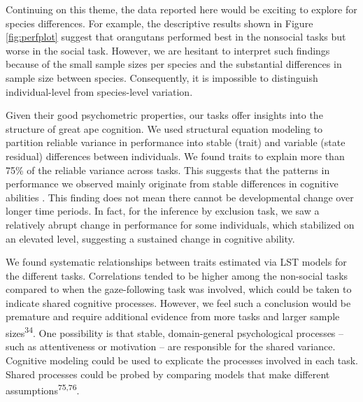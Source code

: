 \documentclass[
  man,floatsintext]{apa6}
\begin{document}
Continuing on this theme, the data reported here would be exciting to explore for species differences. For example, the descriptive results shown in Figure \ref{fig:perfplot} suggest that orangutans performed best in the nonsocial tasks but worse in the social task. However, we are hesitant to interpret such findings because of the small sample sizes per species and the substantial differences in sample size between species. Consequently, it is impossible to distinguish individual-level from species-level variation.

Given their good psychometric properties, our tasks offer insights into the structure of great ape cognition. We used structural equation modeling to partition reliable variance in performance into stable (trait) and variable (state residual) differences between individuals. We found traits to explain more than 75\% of the reliable variance across tasks. This suggests that the patterns in performance we observed mainly originate from stable differences in cognitive abilities . This finding does not mean there cannot be developmental change over longer time periods. In fact, for the inference by exclusion task, we saw a relatively abrupt change in performance for some individuals, which stabilized on an elevated level, suggesting a sustained change in cognitive ability.

We found systematic relationships between traits estimated via LST models for the different tasks. Correlations tended to be higher among the non-social tasks compared to when the gaze-following task was involved, which could be taken to indicate shared cognitive processes. However, we feel such a conclusion would be premature and require additional evidence from more tasks and larger sample sizes\textsuperscript{34}. One possibility is that stable, domain-general psychological processes -- such as attentiveness or motivation -- are responsible for the shared variance. Cognitive modeling could be used to explicate the processes involved in each task. Shared processes could be probed by comparing models that make different assumptions\textsuperscript{75,76}.
\end{document}
